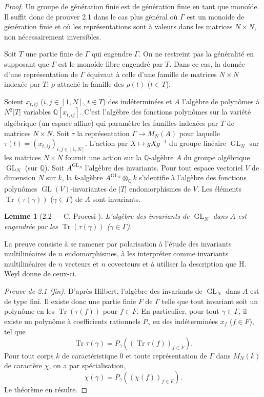 \documentclass[12pt,a4paper]{article}
\theoremstyle{plain}
\newtheorem{lemma}{Lemme}[section]
\theoremstyle{definition}
\DeclareMathOperator{\Tr}{Tr}
\DeclareMathOperator{\GL}{GL}
\newcommand{\QQ}{\mathbb{Q}}
\begin{document}
\begin{proof}
Un groupe de g\'{e}n\'{e}ration finie est de g\'{e}n\'{e}ration finie en tant que mono\'{i}de. Il suffit donc de prouver 2.1 dans le cas plus g\'{e}n\'{e}ral o\`{u} $\Gamma$ est un mono\'{i}de de g\'{e}n\'{e}ration finie et o\`{u} les repr\'{e}sentations sont \`{a} valeurs dans les matrices $N \times N$, non n\'{e}cessairement inversibles.

Soit $T$ une partie finie de $\Gamma$ qui engendre $\Gamma$. On ne restreint pas la g\'{e}n\'{e}ralit\'{e} en supposant que $\Gamma$ est le mono\'{i}de libre engendr\'{e} par $T$. Dans ce cas, la donn\'{e}e d'une repr\'{e}sentation de $\Gamma$ \'{e}quivaut \`{a} celle d'une famille de matrices $N \times N$ index\'{e}e par $T$: $\rho$ attach\'{e} la famille des $\rho(t)$ ($t \in T$).

Soient $x_{t,ij}$ ($i,j \in [1,N]$, $t \in T$) des ind\'{e}termin\'{e}es et $A$ l'alg\`{e}bre de polyn\^{o}mes \`{a} $N^{2}|T|$ variables $\QQ[x_{t,ij}]$. C'est l'alg\`{e}bre des fonctions polyn\^{o}mes sur la vari\'{e}t\'{e} alg\'{e}brique (un espace affine) qui param\`{e}tre les familles index\'{e}es par $T$ de matrices $N \times N$. Soit $\tau$ la repr\'{e}sentation $\Gamma \to M_{N}(A)$ pour laquelle $\tau(t) = (x_{t,ij})_{i,j \in [1,N]}$. L'action par $X \mapsto gXg^{-1}$ du groupe lin\'{e}aire $\GL_{N}$ sur les matrices $N \times N$ fournit une action sur la $\QQ$-alg\`{e}bre $A$ du groupe alg\'{e}brique $\GL_{N}$ (sur $\QQ$). Soit $A^{\GL_{N}}$ l'alg\`{e}bre des invariants. Pour tout espace vectoriel $V$ de dimension $N$ sur $k$, la $k$-alg\`{e}bre $A^{\GL_{N}} \otimes_{\QQ} k$ s'identifie \`{a} l'alg\`{e}bre des fonctions polyn\^{o}mes $\GL(V)$-invariantes de $|T|$ endomorphismes de $V$. Les \'{e}l\'{e}ments $\Tr(\tau(\gamma))$ ($\gamma \in \Gamma$) de $A$ sont invariants.

\begin{lemma}[2.2 --- C. Procesi \cite{Procesi}]
L'alg\`{e}bre des invariants de $\GL_{N}$ dans $A$ est engendr\'{e}e par les $\Tr(\tau(\gamma))$ ($\gamma \in \Gamma$).
\end{lemma}

La preuve consiste \`{a} se ramener par polarisation \`{a} l'\'{e}tude des invariants multilin\'{e}aires de $n$ endomorphismes, \`{a} les interpr\'{e}ter comme invariants multilin\'{e}aires de $n$ vecteurs et $n$ covecteurs et \`{a} utiliser la description que H. Weyl donne de ceux-ci.

\textit{Preuve de 2.1 (fin).} D'apr\`{e}s Hilbert, l'alg\`{e}bre des invariants de $\GL_{N}$ dans $A$ est de type fini. Il existe donc une partie finie $F$ de $\Gamma$ telle que tout invariant soit un polyn\^{o}me en les $\Tr(\tau(f))$ pour $f \in F$. En particulier, pour tout $\gamma \in \Gamma$, il existe un polyn\^{o}me \`{a} coefficients rationnels $P_{\gamma}$ en des ind\'{e}termin\'{e}es $x_{f}$ ($f \in F$), tel que
\[
\Tr \tau(\gamma) = P_{\gamma}((\Tr \tau(f))_{f \in F}).
\]
Pour tout corps $k$ de caract\'{e}ristique $0$ et toute repr\'{e}sentation de $\Gamma$ dans $M_{N}(k)$ de caract\`{e}re $\chi$, on a par sp\'{e}cialisation,
\[
\chi(\gamma) = P_{\gamma}((\chi(f))_{f \in F}).
\]
Le th\'{e}or\`{e}me en r\'{e}sulte.
\end{proof}
\end{document}
